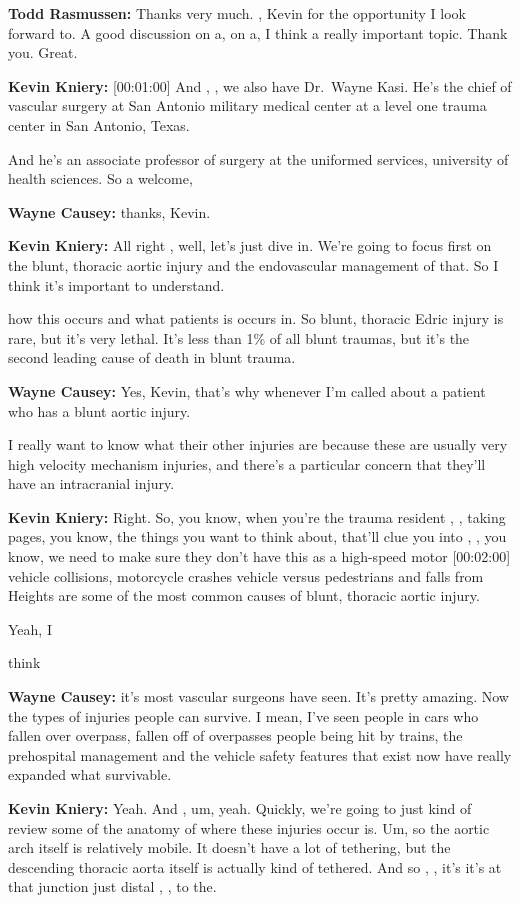 \documentclass[
]{book}
\begin{document}
\textbf{Todd Rasmussen:} Thanks very much. , Kevin for the opportunity I look
forward to. A good discussion on a, on a, I think a really important
topic. Thank you. Great.

\textbf{Kevin Kniery:} {[}00:01:00{]} And , , we also have Dr.~Wayne Kasi. He's
the chief of vascular surgery at San Antonio military medical center at
a level one trauma center in San Antonio, Texas.

And he's an associate professor of surgery at the uniformed services,
university of health sciences. So a welcome,

\textbf{Wayne Causey:} thanks, Kevin.

\textbf{Kevin Kniery:} All right , well, let's just dive in. We're going to
focus first on the blunt, thoracic aortic injury and the endovascular
management of that. So I think it's important to understand.

how this occurs and what patients is occurs in. So blunt, thoracic Edric
injury is rare, but it's very lethal. It's less than 1\% of all blunt
traumas, but it's the second leading cause of death in blunt trauma.

\textbf{Wayne Causey:} Yes, Kevin, that's why whenever I'm called about a
patient who has a blunt aortic injury.

I really want to know what their other injuries are because these are
usually very high velocity mechanism injuries, and there's a particular
concern that they'll have an intracranial injury.

\textbf{Kevin Kniery:} Right. So, you know, when you're the trauma resident ,
, taking pages, you know, the things you want to think about, that'll
clue you into , , you know, we need to make sure they don't have this as
a high-speed motor {[}00:02:00{]} vehicle collisions, motorcycle crashes
vehicle versus pedestrians and falls from Heights are some of the most
common causes of blunt, thoracic aortic injury.

Yeah, I

think

\textbf{Wayne Causey:} it's most vascular surgeons have seen. It's pretty
amazing. Now the types of injuries people can survive. I mean, I've seen
people in cars who fallen over overpass, fallen off of overpasses people
being hit by trains, the prehospital management and the vehicle safety
features that exist now have really expanded what survivable.

\textbf{Kevin Kniery:} Yeah. And , um, yeah. Quickly, we're going to just
kind of review some of the anatomy of where these injuries occur is. Um,
so the aortic arch itself is relatively mobile. It doesn't have a lot of
tethering, but the descending thoracic aorta itself is actually kind of
tethered. And so , , it's it's at that junction just distal , , to the.
\end{document}
